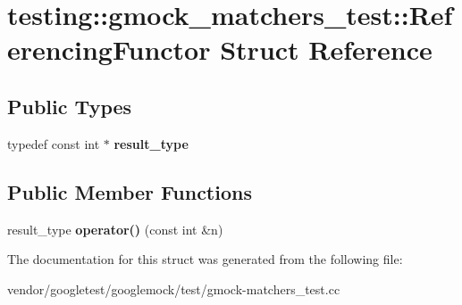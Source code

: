 \hypertarget{structtesting_1_1gmock__matchers__test_1_1_referencing_functor}{}\section{testing\+:\+:gmock\+\_\+matchers\+\_\+test\+:\+:Referencing\+Functor Struct Reference}
\label{structtesting_1_1gmock__matchers__test_1_1_referencing_functor}
\subsection*{Public Types}
\begin{DoxyCompactItemize}
\item 
\mbox{\label{structtesting_1_1gmock__matchers__test_1_1_referencing_functor_a5856a8175e2f797a6733a363b2834094}} 
typedef const int $\ast$ {\bfseries result\+\_\+type}
\end{DoxyCompactItemize}
\subsection*{Public Member Functions}
\begin{DoxyCompactItemize}
\item 
\mbox{\label{structtesting_1_1gmock__matchers__test_1_1_referencing_functor_a149f15ed9afbff28f5c3639c0f3eb255}} 
result\+\_\+type {\bfseries operator()} (const int \&n)
\end{DoxyCompactItemize}


The documentation for this struct was generated from the following file\+:\begin{DoxyCompactItemize}
\item 
vendor/googletest/googlemock/test/gmock-\/matchers\+\_\+test.\+cc\end{DoxyCompactItemize}
